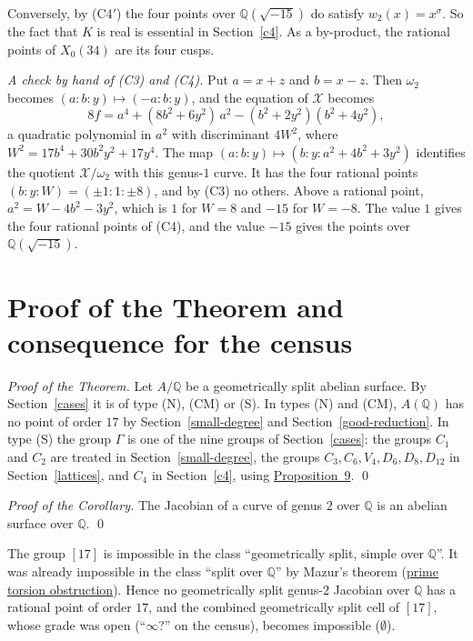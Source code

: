 \documentclass[11pt]{article}
\newcommand{\Q}{\mathbb Q}
\begin{document}
\medskip
Conversely, by (C4\('\)) the four points over \(\Q(\sqrt{-15})\) do satisfy
\(w_2(x)=x^\sigma\). So the fact that \(K\) is real is essential in Section~\ref{c4}. As a by-product, the rational
points of \(X_0(34)\) are its four cusps.

\medskip
\emph{A check by hand of (C3) and (C4).} Put \(a=x+z\) and \(b=x-z\). Then \(\omega_2\) becomes
\((a:b:y)\mapsto(-a:b:y)\), and the equation of \(\mathcal X\) becomes
\[8f=a^4+(8b^2+6y^2)\,a^2-(b^2+2y^2)(b^2+4y^2),\]
a quadratic polynomial in \(a^2\) with discriminant \(4W^2\), where
\(W^2=17b^4+30b^2y^2+17y^4\). The map \((a:b:y)\mapsto(b:y:a^2+4b^2+3y^2)\) identifies the quotient
\(\mathcal X/\omega_2\) with this genus-\(1\) curve. It has the four rational points
\((b:y:W)=(\pm1:1:\pm8)\), and by (C3) no others. Above a rational point,
\(a^2=W-4b^2-3y^2\), which is \(1\) for \(W=8\) and \(-15\) for \(W=-8\). The value \(1\) gives the
four rational points of (C4), and the value \(-15\) gives the points over \(\Q(\sqrt{-15})\).

\section{Proof of the Theorem and consequence for the census}\label{census}

\emph{Proof of the Theorem.} Let \(A/\Q\) be a geometrically split abelian surface. By
Section~\ref{cases} it is of type (N), (CM) or (S). In types (N) and (CM), \(A(\Q)\) has no point
of order \(17\) by Section~\ref{small-degree} and Section~\ref{good-reduction}. In type (S) the
group \(\Gamma\) is one of the nine groups of Section~\ref{cases}: the groups \(C_1\) and \(C_2\)
are treated in Section~\ref{small-degree}, the groups \(C_3,C_6,V_4,D_6,D_8,D_{12}\) in
Section~\ref{lattices}, and \(C_4\) in Section~\ref{c4}, using
\hyperref[prop-x034]{Proposition~9}. \qed

\medskip
\emph{Proof of the Corollary.} The Jacobian of a curve of genus \(2\) over \(\Q\) is an abelian
surface over \(\Q\). \qed

\medskip
The group \href{https://genus-2-torsion.github.io/group.html?g=17}{\([17]\)} is impossible in the
class ``geometrically split, simple over \(\Q\)''. It was already impossible in the class ``split
over \(\Q\)'' by Mazur's theorem
(\href{https://genus-2-torsion.github.io/proofs/qsplit-prime-obstruction.html}{prime torsion
obstruction}). Hence no geometrically split genus-\(2\) Jacobian over \(\Q\) has a rational point
of order \(17\), and the combined geometrically split cell of
\href{https://genus-2-torsion.github.io/group.html?g=17}{\([17]\)}, whose grade was open
(``\(\infty\)?'' on the census), becomes impossible (\(\emptyset\)).
\end{document}
